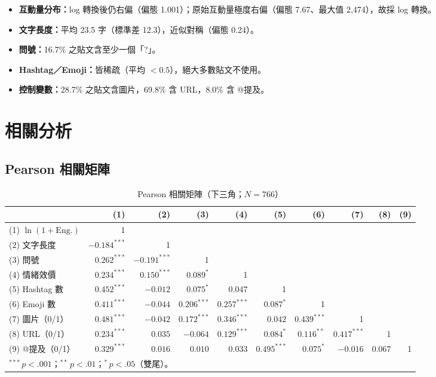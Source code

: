 \documentclass[12pt,a4paper]{ctexart}
\begin{document}
\begin{itemize}
    \item \textbf{互動量分布：}log 轉換後仍右偏（偏態 1.001）；原始互動量極度右偏（偏態 7.67、最大值 2{,}474），故採 log 轉換。
    \item \textbf{文字長度：}平均 23.5 字（標準差 12.3），近似對稱（偏態 0.24）。
    \item \textbf{問號：}16.7\% 之貼文含至少一個「?」。
    \item \textbf{Hashtag／Emoji：}皆稀疏（平均 $<0.5$），絕大多數貼文不使用。
    \item \textbf{控制變數：}28.7\% 之貼文含圖片，69.8\% 含 URL，8.0\% 含 @提及。
\end{itemize}

\newpage

\section{相關分析}

\subsection{Pearson 相關矩陣}

\begin{table}[H]
\centering
\caption{Pearson 相關矩陣（下三角；$N=766$）}
\label{tab:corr_full}
\small
\setlength{\tabcolsep}{3pt}
\begin{tabular}{lrrrrrrrrr}
\toprule
 & (1) & (2) & (3) & (4) & (5) & (6) & (7) & (8) & (9) \\
\midrule
(1) $\ln(1+\text{Eng.})$ & 1 & & & & & & & & \\
(2) 文字長度 & $-0.184^{***}$ & 1 & & & & & & & \\
(3) 問號 & $0.262^{***}$ & $-0.191^{***}$ & 1 & & & & & & \\
(4) 情緒效價 & $0.234^{***}$ & $0.150^{***}$ & $0.089^{*}$ & 1 & & & & & \\
(5) Hashtag 數 & $0.452^{***}$ & $-0.012$ & $0.075^{*}$ & $0.047$ & 1 & & & & \\
(6) Emoji 數 & $0.411^{***}$ & $-0.044$ & $0.206^{***}$ & $0.257^{***}$ & $0.087^{*}$ & 1 & & & \\
(7) 圖片（0/1）& $0.481^{***}$ & $-0.042$ & $0.172^{***}$ & $0.346^{***}$ & $0.042$ & $0.439^{***}$ & 1 & & \\
(8) URL（0/1）& $0.234^{***}$ & $0.035$ & $-0.064$ & $0.129^{***}$ & $0.084^{*}$ & $0.116^{**}$ & $0.417^{***}$ & 1 & \\
(9) @提及（0/1）& $0.329^{***}$ & $0.016$ & $0.010$ & $0.033$ & $0.495^{***}$ & $0.075^{*}$ & $-0.016$ & $0.067$ & 1 \\
\bottomrule
\multicolumn{10}{l}{\small $^{***}\,p<.001$；$^{**}\,p<.01$；$^{*}\,p<.05$（雙尾）。} \\
\end{tabular}
\end{table}
\end{document}
